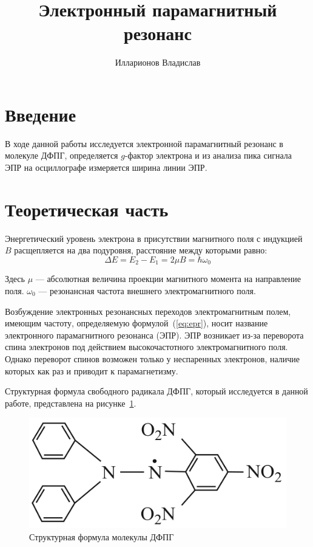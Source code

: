\documentclass[reprint, nofootinbib, nobalancelastpage, 10pt]{revtex4-2}
\begin{document}
\title{Электронный парамагнитный резонанс}
\author{Илларионов Владислав}

\maketitle


\section*{Введение}

В ходе данной работы исследуется электронной парамагнитный резонанс в молекуле ДФПГ,
определяется $g$-фактор электрона и из анализа пика сигнала ЭПР на осциллографе измеряется
ширина линии ЭПР.


\section*{Теоретическая часть}

Энергетический уровень электрона в присутствии магнитного поля с индукцией $B$
расщепляется на два подуровня, расстояние между которыми равно:
\begin{equation}
	\label{eq:epr}
	\Delta E = E_2 - E_1 = 2 \mu B = \hbar \omega_0
\end{equation}

Здесь $\mu$ --- абсолютная величина проекции магнитного момента на направление поля.
$\omega_0$ --- резонансная частота внешнего электромагнитного поля.

Возбуждение электронных резонансных переходов электромагнитным полем, имеющим частоту,
определяемую формулой~(\ref{eq:epr}), носит название электронного парамагнитного
резонанса (ЭПР). ЭПР возникает из-за переворота спина электронов под действием
высокочастотного электромагнитного поля. Однако переворот спинов возможен только у
неспаренных электронов, наличие которых как раз и приводит к парамагнетизму.

Структурная формула свободного радикала ДФПГ, который исследуется в данной работе,
представлена на рисунке~\ref{img:1}.

\begin{figure}[h!]
	\includegraphics[width=0.6\linewidth]{1.png}
	\caption{Структурная формула молекулы ДФПГ}
	\label{img:1}
\end{figure}
\end{document}
